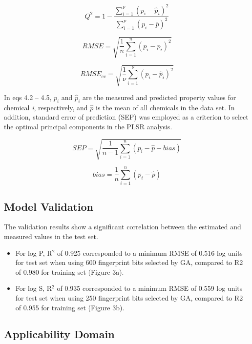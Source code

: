 \documentclass[10pt, letter]{article}
\renewcommand{\=}{\, =\, }
\newcommand{\+}{\, +\, }
\renewcommand{\-}{\, -\, }
\begin{document}
\begin{equation}
Q^{2} = 1 - \frac{\sum_{i = 1}^\nu(p_{i}-\hat{p}_{i})^{2}}{\sum_{i = 1}^\nu(p_{i}-\bar{p})^{2}}
\end{equation}

\begin{equation}
RMSE = \sqrt{\frac{1}{n}\sum_{i = 1}^n(p_{i}-\hat{p}_{i})^{2}}
\end{equation}

\begin{equation}
RMSE_{cv} = \sqrt{\frac{1}{\nu}\sum_{i = 1}^\nu(p_{i}-\hat{p}_{i})^{2}}
\end{equation}

In eqs 4.2 -- 4.5, \(p_{i}\) and \(\hat{p}_{i}\)
are the measured and predicted property
values for chemical \textit{i}, respectively, and \( \hat{p} \) is the mean of all
chemicals in the data set. In addition, standard error of
prediction (SEP) was employed as a criterion to select the
optimal principal components in the PLSR analysis.

\begin{equation}
SEP = \sqrt{\frac{1}{n-1}\sum_{i = 1}^n(p_{i}-\hat{p} - bias)}
\end{equation}

\begin{equation}
bias = \frac{1}{n}\sum_{i = 1}^{n}(p_{i}-\hat{p})
\end{equation}

\subsection{Model Validation}

The validation results show a significant correlation between the estimated and
measured values in the test set.
\begin{itemize}
\item For log P, R\(^{2}\) of 0.925 corresponded to a minimum RMSE of 0.516 log units
for test set when using 600 fingerprint bits selected by GA, compared to R2 of
0.980 for training set (Figure 3a).
\item For log S, R\(^{2}\) of 0.935 corresponded to a minimum RMSE of 0.559 log units
for test set when using 250 fingerprint bits selected by GA, compared to R2 of
0.955 for training set (Figure 3b).
\end{itemize}

\subsection{Applicability Domain}
\end{document}
